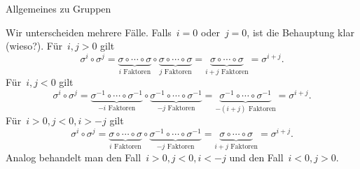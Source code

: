 \documentclass{algblatt}
\begin{document}
\begin{aufgabe}{Allgemeines zu Gruppen}
\begin{loesungE}
\item Wir unterscheiden mehrere Fälle. Falls~$i = 0$ oder~$j = 0$, ist die
Behauptung klar (wieso?). Für~$i,j > 0$ gilt
\[ \sigma^i \circ \sigma^j =
  \underbrace{\sigma \circ \cdots \circ \sigma}_{\text{$i$ Faktoren}}
  \circ
  \underbrace{\sigma \circ \cdots \circ \sigma}_{\text{$j$ Faktoren}} =
  \underbrace{\sigma \circ \cdots \circ \sigma}_{\text{$i+j$ Faktoren}} =
  \sigma^{i+j}. \]
Für~$i, j < 0$ gilt
\[ \sigma^i \circ \sigma^j =
  \underbrace{\sigma^{-1} \circ \cdots \circ \sigma^{-1}}_{\text{$-i$ Faktoren}}
  \circ
  \underbrace{\sigma^{-1} \circ \cdots \circ \sigma^{-1}}_{\text{$-j$ Faktoren}} =
  \underbrace{\sigma^{-1} \circ \cdots \circ \sigma^{-1}}_{\text{$-(i+j)$ Faktoren}} =
  \sigma^{i+j}. \]
Für~$i > 0, j < 0, i > -j$ gilt
\[ \sigma^i \circ \sigma^j =
  \underbrace{\sigma \circ \cdots \circ \sigma}_{\text{$i$ Faktoren}}
  \circ
  \underbrace{\sigma^{-1} \circ \cdots \circ \sigma^{-1}}_{\text{$-j$ Faktoren}} =
  \underbrace{\sigma \circ \cdots \circ \sigma}_{\text{$i+j$ Faktoren}} =
  \sigma^{i+j}. \]
Analog behandelt man den Fall~$i > 0, j < 0, i < -j$ und den Fall~$i < 0, j >
0$.
\end{loesungE}
\end{aufgabe}
\end{document}
